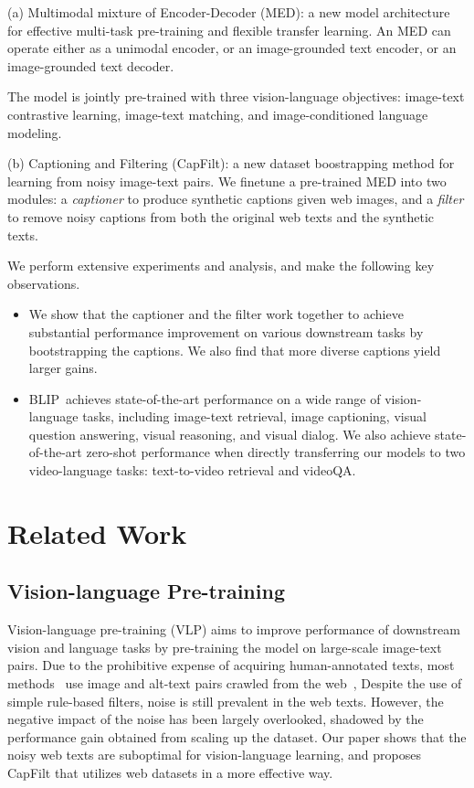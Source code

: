 (a) Multimodal mixture of Encoder-Decoder (MED): a new model architecture for effective multi-task pre-training and flexible transfer learning. An MED can operate either as a unimodal encoder, or an image-grounded text encoder, or an image-grounded text decoder.

The model is jointly pre-trained with three vision-language objectives: image-text contrastive learning, image-text matching, and image-conditioned language modeling.

(b) Captioning and Filtering (CapFilt): a new dataset boostrapping method for learning from noisy image-text pairs. We finetune a pre-trained MED into two modules: a \textit{captioner} to produce synthetic captions given web images, and a \textit{filter} to remove noisy captions from both the original web texts and the synthetic texts.

We perform extensive experiments and analysis, and make the following key observations.

\begin{itemize}[leftmargin=*]

	\item We show that the captioner and the filter work together to achieve substantial performance improvement on various downstream tasks by bootstrapping the captions. We also find that more diverse captions yield larger gains.
	\item BLIP~achieves state-of-the-art performance on a wide range of vision-language tasks, including image-text retrieval, image captioning, visual question answering, visual reasoning, and visual dialog. We also achieve state-of-the-art zero-shot performance when directly transferring our models to two video-language tasks: text-to-video retrieval and videoQA.
\end{itemize}

\section{Related Work}

\subsection{Vision-language Pre-training}

Vision-language pre-training (VLP) aims to improve performance of downstream vision and language tasks by pre-training the model on large-scale image-text pairs. Due to the prohibitive expense of acquiring human-annotated texts, most methods~\cite{uniter,oscar,ALBEF,simvlm,clip} use image and alt-text pairs crawled from the web~\cite{CC,cc12m,align}, Despite the use of simple rule-based filters, noise is still prevalent in the web texts. However, the negative impact of the noise has been largely overlooked, shadowed by the performance gain obtained from scaling up the dataset. Our paper shows that the noisy web texts are suboptimal for vision-language learning, and proposes CapFilt that utilizes web datasets in a more effective way.

